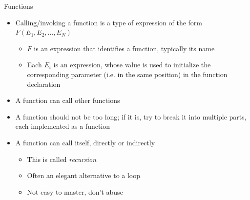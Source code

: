 \begin{frame}{Functions \insertcontinuationtext}

  \begin{itemize}
  \item<1-> Calling/invoking a function is a type of expression of the form $F(E_1,
    E_2, \ldots, E_N)$
    \begin{itemize}
    \item $F$ is an expression that identifies a function, typically its name
    \item Each $E_i$ is an expression, whose value is used to initialize the
      corresponding parameter (i.e. in the same position) in the function
      declaration
    \end{itemize}


  \item<3-> A function can call other functions
  \item<4-> A function should not be too long; if it is, try to break it into
    multiple parts, each implemented as a function
  \item<5-> A function can call itself, directly or indirectly
    \begin{itemize}
    \item This is called \textit{recursion}
    \item Often an elegant alternative to a loop
    \item Not easy to master, don't abuse
    \end{itemize}
  \end{itemize}

\end{frame}

